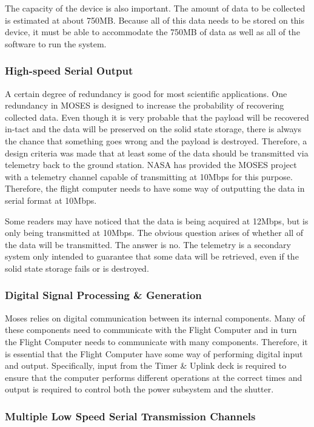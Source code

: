 \documentclass[11pt,titlepage]{article}
\begin{document}
The capacity of the device is also important. The amount of data to be collected is estimated at about 750MB. Because all of this data needs
to be stored on this device, it must be able to accommodate the 750MB of data as well as all of the software to run the system.

\subsubsection{High-speed Serial Output}

A certain degree of redundancy is good for most scientific applications. One redundancy in MOSES is designed to increase the probability
of recovering collected data. Even though it is very probable that the payload will be recovered in-tact and the data will be preserved on the
solid state storage, there is always the chance that something goes wrong and the payload is destroyed. Therefore, a design criteria was made that
at least some of the data should be transmitted via telemetry back to the ground station. NASA has provided the MOSES project with a telemetry 
channel capable of transmitting at 10Mbps for this purpose. Therefore, the flight computer needs to have some way of outputting the data in serial
format at 10Mbps.

Some readers may have noticed that the data is being acquired at 12Mbps, but is only being transmitted at 10Mbps. The obvious question arises of 
whether all of the data will be transmitted. The answer is no. The telemetry is a secondary system only intended to guarantee that some data will be
retrieved, even if the solid state storage fails or is destroyed.

\subsubsection{Digital Signal Processing \& Generation}

Moses relies on digital communication between its internal components. Many of these components need to communicate with the Flight Computer and in turn
the Flight Computer needs to communicate with many components. Therefore, it is essential that the Flight Computer have some way of performing digital
input and output. Specifically, input from the Timer \& Uplink deck is required to ensure that the computer performs different operations at the correct
times and output is required to control both the power subsystem and the shutter.

\subsubsection{Multiple Low Speed Serial Transmission Channels}
\end{document}
